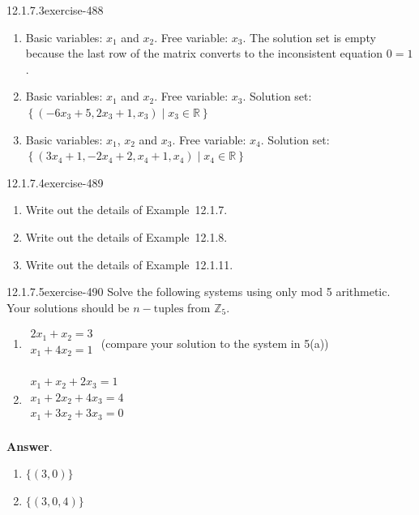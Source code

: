 \documentclass[twoside,10pt,]{book}
\numberwithin{equation}{section}
\begin{document}
\begin{divisionsolution}{12.1.7.3}{}{exercise-488}
\begin{enumerate}[label=(\alph*)]
\item\hypertarget{li-2018}{}\hypertarget{p-4400}{}%
Basic variables: \(x_1\) and \(x_2\).  Free variable: \(x_3\). The solution set is empty because the last row of the matrix converts to the inconsistent equation \(0=1\).%
\item\hypertarget{li-2019}{}\hypertarget{p-4401}{}%
Basic variables: \(x_1\) and \(x_2\).  Free variable: \(x_3\).  Solution set: \(\left\{\left(-6 x_3 + 5, 2 x_3+1, x_3 \right) \mid x_3 \in  \mathbb{R}\right\}\)%
\item\hypertarget{li-2020}{}\hypertarget{p-4402}{}%
Basic variables: \(x_1\), \(x_2\) and \(x_3\).  Free variable: \(x_4\). Solution set: \(\left\{\left(3 x_4 + 1, -2x_4 + 2, x_4 + 1, x_4\right) \mid  x_4 \in  \mathbb{R}\right\}\)%
\end{enumerate}
%
\end{divisionsolution}%
\begin{divisionsolution}{12.1.7.4}{}{exercise-489}%
\hypertarget{p-4403}{}%
\leavevmode%
\begin{enumerate}[label=(\alph*)]
\item\hypertarget{li-2021}{}\hypertarget{p-4404}{}%
Write out the details of Example~12.1.7.%
\item\hypertarget{li-2022}{}\hypertarget{p-4405}{}%
Write out the details of Example~12.1.8.%
\item\hypertarget{li-2023}{}\hypertarget{p-4406}{}%
Write out the details of Example~12.1.11.%
\end{enumerate}
%
\end{divisionsolution}%
\begin{divisionsolution}{12.1.7.5}{}{exercise-490}%
\hypertarget{p-4407}{}%
Solve the following systems using only mod 5 arithmetic. Your solutions should be \(n-\textrm{tuples}\) from \(\mathbb{Z}_5\).\leavevmode%
\begin{enumerate}[label=(\alph*)]
\item\hypertarget{li-2024}{}\hypertarget{p-4408}{}%
\(\begin{array}{l}
2 x_1+ x_2=3 \\
x_1+4 x_2=1 \\
\end{array}\) (compare your solution to the system in 5(a))%
\item\hypertarget{li-2025}{}\hypertarget{p-4409}{}%
\(\begin{array}{l}
x_1+x_2+2 x_3=1 \\
x_1+2 x_2+4 x_3=4 \\
x_1+3 x_2+3 x_3=0 \\
\end{array}\)%
\end{enumerate}
%
\par\smallskip%
\noindent\textbf{Answer}.\quad%
\hypertarget{p-4410}{}%
\leavevmode%
\begin{enumerate}[label=(\alph*)]
\item\hypertarget{li-2026}{}\hypertarget{p-4411}{}%
\(\{(3,0)\}\)%
\item\hypertarget{li-2027}{}\hypertarget{p-4412}{}%
\(\{(3,0,4)\}\)%
\end{enumerate}
%
\end{divisionsolution}%
\end{document}
